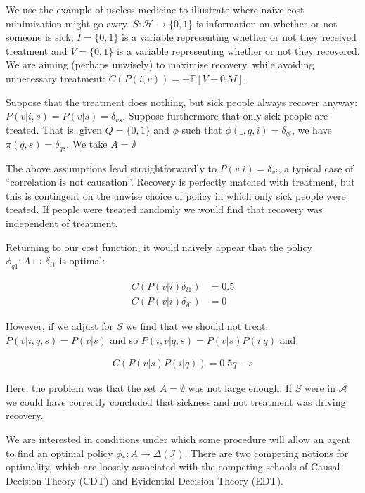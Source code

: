\begin{example}
We use the example of useless medicine to illustrate where naive cost minimization might go awry. $S:\mathcal{H}\to \{0,1\}$ is information on whether or not someone is sick, $I=\{0,1\}$ is a variable representing whether or not they received treatment and $V=\{0,1\}$ is a variable representing whether or not they recovered. We are aiming (perhaps unwisely) to maximise recovery, while avoiding unnecessary treatment: $C(P(i,v))=-\mathbb{E}[V-0.5I]$. 

Suppose that the treatment does nothing, but sick people always recover anyway: $P(v|i,s) = P(v|s) = \delta_{vs}$. Suppose furthermore that only sick people are treated. That is, given $Q=\{0,1\}$ and $\phi$ such that $\phi(\_,q,i)=\delta_{qi}$, we have $\pi(q,s)=\delta_{qs}$. We take $A=\emptyset$

The above assumptions lead straightforwardly to $P(v|i)=\delta_{vi}$, a typical case of ``correlation is not causation''. Recovery is perfectly matched with treatment, but this is contingent on the unwise choice of policy in which only sick people were treated. If people were treated randomly we would find that recovery was independent of treatment.

Returning to our cost function, it would naively appear that the policy $\phi_{q1}:A\mapsto \delta_{i1}$ is optimal:

\begin{align}
    C(P(v|i)\delta_{i1}) &= 0.5\\
    C(P(v|i)\delta_{i0}) &= 0
\end{align}

However, if we adjust for $S$ we find that we should not treat. $P(v|i,q,s)=P(v|s)$ and so $P(i,v|q,s)=P(v|s)P(i|q)$ and

\begin{align}
    C(P(v|s)P(i|q)) = 0.5q - s
\end{align}

Here, the problem was that the set $A=\emptyset$ was not large enough. If $S$ were in $\mathcal{A}$ we could have correctly concluded that sickness and not treatment was driving recovery.
\end{example}

We are interested in conditions under which some procedure will allow an agent to find an optimal policy  $\phi_*: A\to \Delta(\mathcal{I})$. There are two competing notions for optimality, which are loosely associated with the competing schools of Causal Decision Theory (CDT) and Evidential Decision Theory (EDT).

